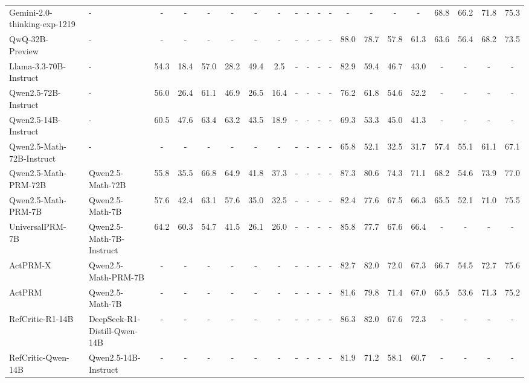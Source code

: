 \begin{table}[H]
{\begin{tabular}{@{} l|l|cccccc|cccc|cccc|cccc @{}}
Gemini-2.0-thinking-exp-1219~\cite{google2025gemini20flashthinking} & - & - & - & - & - & - & - & - & - & - & - & - & - & - & - & 68.8 & 66.2 & 71.8 & 75.3 \\
QwQ-32B-Preview~\cite{qwen2024qwqpreview} & - & - & - & - & - & - & - & - & - & - & - & 88.0 & 78.7 & 57.8 & 61.3 & 63.6 & 56.4 & 68.2 & 73.5 \\
Llama-3.3-70B-Instruct~\cite{meta2024llama33} & - & 54.3 & 18.4 & 57.0 & 28.2 & 49.4 & 2.5 & - & - & - & - & 82.9 & 59.4 & 46.7 & 43.0 & - & - & - & - \\
Qwen2.5-72B-Instruct~\cite{qwen2024qwen25} & - & 56.0 & 26.4 & 61.1 & 46.9 & 26.5 & 16.4 & - & - & - & - & 76.2 & 61.8 & 54.6 & 52.2 & - & - & - & - \\
Qwen2.5-14B-Instruct~\cite{qwen2024qwen25} & - & 60.5 & 47.6 & 63.4 & 63.2 & 43.5 & 18.9 & - & - & - & - & 69.3 & 53.3 & 45.0 & 41.3 & - & - & - & - \\
Qwen2.5-Math-72B-Instruct~\cite{qwen2024qwen25math} & - & - & - & - & - & - & - & - & - & - & - & 65.8 & 52.1 & 32.5 & 31.7 & 57.4 & 55.1 & 61.1 & 67.1 \\
\midrule
Qwen2.5-Math-PRM-72B~\cite{zhang2025qwenlessons} & Qwen2.5-Math-72B & 55.8 & 35.5 & 66.8 & 64.9 & 41.8 & 37.3 & - & - & - & - & 87.3 & 80.6 & 74.3 & 71.1 & 68.2 & 54.6 & 73.9 & 77.0 \\
Qwen2.5-Math-PRM-7B~\cite{zhang2025qwenlessons} & Qwen2.5-Math-7B & 57.6 & 42.4 & 63.1 & 57.6 & 35.0 & 32.5 & - & - & - & - & 82.4 & 77.6 & 67.5 & 66.3 & 65.5 & 52.1 & 71.0 & 75.5 \\
UniversalPRM-7B~\cite{tan2025aurora} & Qwen2.5-Math-7B-Instruct & 64.2 & 60.3 & 54.7 & 41.5 & 26.1 & 26.0 & - & - & - & - & 85.8 & 77.7 & 67.6 & 66.4 & - & - & - & - \\
ActPRM-X~\cite{duan2025activeprm} & Qwen2.5-Math-PRM-7B & - & - & - & - & - & - & - & - & - & - & 82.7 & 82.0 & 72.0 & 67.3 & 66.7 & 54.5 & 72.7 & 75.6 \\
ActPRM~\cite{duan2025activeprm} & Qwen2.5-Math-7B & - & - & - & - & - & - & - & - & - & - & 81.6 & 79.8 & 71.4 & 67.0 & 65.5 & 53.6 & 71.3 & 75.2 \\
RefCritic-R1-14B~\cite{tang2025refcritic} & DeepSeek-R1-Distill-Qwen-14B & - & - & - & - & - & - & - & - & - & - & 86.3 & 82.0 & 67.6 & 72.3 & - & - & - & - \\
RefCritic-Qwen-14B~\cite{tang2025refcritic} & Qwen2.5-14B-Instruct & - & - & - & - & - & - & - & - & - & - & 81.9 & 71.2 & 58.1 & 60.7 & - & - & - & - \\

\end{tabular}}
\end{table}
